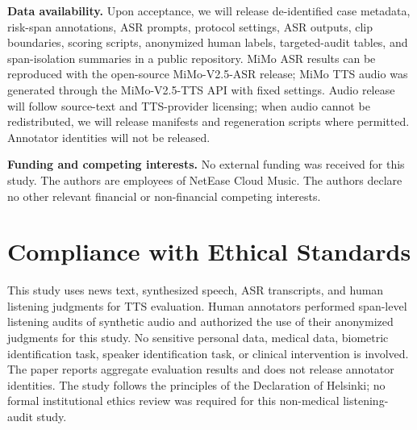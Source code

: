 \documentclass{article}
\begin{document}
\textbf{Data availability.} Upon acceptance, we will release de-identified case metadata, risk-span annotations, ASR prompts, protocol settings, ASR outputs, clip boundaries, scoring scripts, anonymized human labels, targeted-audit tables, and span-isolation summaries in a public repository. MiMo ASR results can be reproduced with the open-source MiMo-V2.5-ASR release; MiMo TTS audio was generated through the MiMo-V2.5-TTS API with fixed settings. Audio release will follow source-text and TTS-provider licensing; when audio cannot be redistributed, we will release manifests and regeneration scripts where permitted. Annotator identities will not be released.

\textbf{Funding and competing interests.} No external funding was received for this study. The authors are employees of NetEase Cloud Music. The authors declare no other relevant financial or non-financial competing interests.

\clearpage
\section{Compliance with Ethical Standards}

This study uses news text, synthesized speech, ASR transcripts, and human listening judgments for TTS evaluation. Human annotators performed span-level listening audits of synthetic audio and authorized the use of their anonymized judgments for this study. No sensitive personal data, medical data, biometric identification task, speaker identification task, or clinical intervention is involved. The paper reports aggregate evaluation results and does not release annotator identities. The study follows the principles of the Declaration of Helsinki; no formal institutional ethics review was required for this non-medical listening-audit study.
\end{document}
